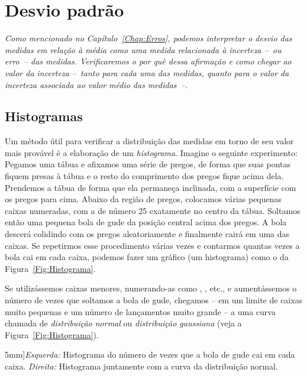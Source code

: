 \chapter{Desvio padrão}
\label{Chap:DesvioPadrao}

{\it
Como mencionado no Capítulo~\ref{Chap:Erros}, podemos interpretar o desvio das medidas em relação à média como uma medida relacionada à incerteza --~ou erro~-- das medidas. Verificaremos o por quê dessa afirmação e como chegar ao valor da incerteza --~tanto para cada uma das medidas, quanto para o valor da incerteza associada ao valor médio das medidas~--.
}

\section{Histogramas}

Um método útil para verificar a distribuição das medidas em torno de seu valor mais provável é a elaboração de um \emph{histograma}. Imagine o seguinte experimento: Pegamos uma tábua e afixamos uma série de pregos, de forma que suas pontas fiquem presas à tábua e o resto do comprimento dos pregos fique acima dela. Prendemos a tábua de forma que ela permaneça inclinada, com a superfície com os pregos para cima. Abaixo da região de pregos, colocamos várias pequenas caixas numeradas, com a de número 25 exatamente no centro da tábua. Soltamos então uma pequena bola de gude da posição central acima dos pregos. A bola descerá colidindo com os pregos aleatoriamente e finalmente cairá em uma das caixas. Se repetirmos esse procedimento várias vezes e contarmos quantas vezes a bola cai em cada caixa, podemos fazer um gráfico (um histograma) como o da Figura~\ref{Fig:Histograma}.

Se utilizássemos caixas menores, numerando-as como , , etc., e aumentássemos o número de vezes que soltamos a bola de gude, chegamos -- em um limite de caixas muito pequenas e um número de lançamentos muito grande -- a uma curva chamada de \emph{distribuição normal} ou \emph{distribuição gaussiana} (veja a Figura~\ref{Fig:Histograma}).

\begin{figure*}
\forceversofloat
\centering
\caption[][5mm]{\emph{Esquerda:} Histograma do número de vezes que a bola de gude cai em cada caixa. \emph{Direita:} Histograma juntamente com a curva da distribuição normal.}
\label{Fig:Histograma}
\begin{minipage}{0.45\textwidth}
\centering

\end{minipage}
\hfill
\begin{minipage}{0.45\textwidth}
\centering

\end{minipage}
\end{figure*}

